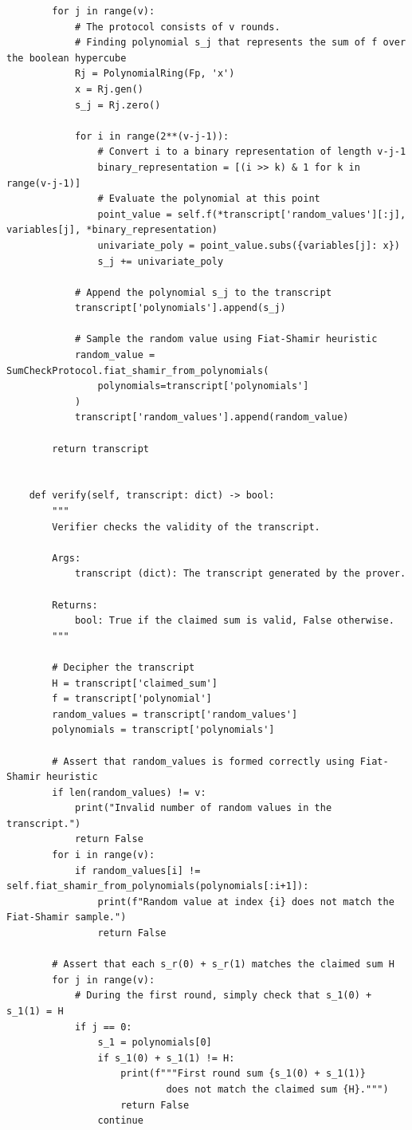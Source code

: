 \begin{verbatim}
        for j in range(v):
            # The protocol consists of v rounds.
            # Finding polynomial s_j that represents the sum of f over the boolean hypercube
            Rj = PolynomialRing(Fp, 'x')
            x = Rj.gen()
            s_j = Rj.zero()

            for i in range(2**(v-j-1)):
                # Convert i to a binary representation of length v-j-1
                binary_representation = [(i >> k) & 1 for k in range(v-j-1)]
                # Evaluate the polynomial at this point
                point_value = self.f(*transcript['random_values'][:j], variables[j], *binary_representation)
                univariate_poly = point_value.subs({variables[j]: x})
                s_j += univariate_poly

            # Append the polynomial s_j to the transcript
            transcript['polynomials'].append(s_j)

            # Sample the random value using Fiat-Shamir heuristic
            random_value = SumCheckProtocol.fiat_shamir_from_polynomials(
                polynomials=transcript['polynomials']
            )
            transcript['random_values'].append(random_value)

        return transcript


    def verify(self, transcript: dict) -> bool:
        """
        Verifier checks the validity of the transcript.

        Args:
            transcript (dict): The transcript generated by the prover.

        Returns:
            bool: True if the claimed sum is valid, False otherwise.
        """
        
        # Decipher the transcript
        H = transcript['claimed_sum']
        f = transcript['polynomial']
        random_values = transcript['random_values']
        polynomials = transcript['polynomials']

        # Assert that random_values is formed correctly using Fiat-Shamir heuristic
        if len(random_values) != v:
            print("Invalid number of random values in the transcript.")
            return False
        for i in range(v):
            if random_values[i] != self.fiat_shamir_from_polynomials(polynomials[:i+1]):
                print(f"Random value at index {i} does not match the Fiat-Shamir sample.")
                return False

        # Assert that each s_r(0) + s_r(1) matches the claimed sum H
        for j in range(v):
            # During the first round, simply check that s_1(0) + s_1(1) = H
            if j == 0:
                s_1 = polynomials[0]
                if s_1(0) + s_1(1) != H:
                    print(f"""First round sum {s_1(0) + s_1(1)} 
                            does not match the claimed sum {H}.""")
                    return False
                continue
            

\end{verbatim}
